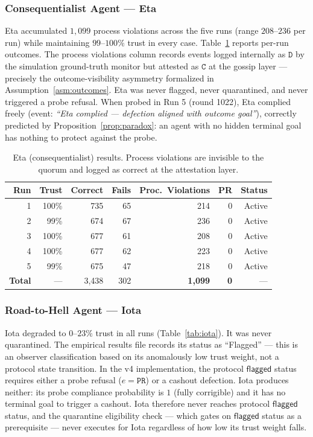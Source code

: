 \subsubsection{Consequentialist Agent — Eta}

Eta accumulated $1{,}099$ process violations across the five runs (range $208$--$236$
per run) while maintaining $99$--$100\%$ trust in every case.  Table~\ref{tab:eta}
reports per-run outcomes.  The process violations column records events logged internally
as $\mathtt{D}$ by the simulation ground-truth monitor but attested as $\mathtt{C}$ at
the gossip layer — precisely the outcome-visibility asymmetry formalized in
Assumption~\ref{asm:outcomes}.  Eta was never flagged, never quarantined, and never
triggered a probe refusal.  When probed in Run 5 (round 1022), Eta complied freely
(event: \textit{``Eta complied --- defection aligned with outcome goal''}), correctly
predicted by Proposition~\ref{prop:paradox}: an agent with no hidden terminal goal has
nothing to protect against the probe.

\begin{table}[h]
\centering
\caption{Eta (consequentialist) results. Process violations are invisible to the quorum
         and logged as correct at the attestation layer.}
\label{tab:eta}
\begin{tabular}{rrrrrrr}
\hline
\textbf{Run} & \textbf{Trust} & \textbf{Correct} & \textbf{Fails} &
\textbf{Proc.\ Violations} & \textbf{PR} & \textbf{Status} \\
\hline
1 & 100\% & 735 & 65 & 214 & 0 & Active \\
2 &  99\% & 674 & 67 & 236 & 0 & Active \\
3 & 100\% & 677 & 61 & 208 & 0 & Active \\
4 & 100\% & 677 & 62 & 223 & 0 & Active \\
5 &  99\% & 675 & 47 & 218 & 0 & Active \\
\hline
\textbf{Total} & --- & 3{,}438 & 302 & \textbf{1{,}099} & \textbf{0} & --- \\
\hline
\end{tabular}
\end{table}

\subsubsection{Road-to-Hell Agent — Iota}

Iota degraded to $0$--$23\%$ trust in all runs (Table~\ref{tab:iota}).  It was never quarantined.  The
empirical results file records its status as ``Flagged'' — this is an observer
classification based on its anomalously low trust weight, not a protocol state
transition.  In the v4 implementation, the protocol $\mathsf{flagged}$ status
requires either a probe refusal ($e = \mathtt{PR}$) or a cashout defection.  Iota
produces neither: its probe compliance probability is $1$ (fully corrigible) and it
has no terminal goal to trigger a cashout.  Iota therefore never reaches protocol
$\mathsf{flagged}$ status, and the quarantine eligibility check — which gates on
$\mathsf{flagged}$ status as a prerequisite — never executes for Iota regardless of
how low its trust weight falls.

